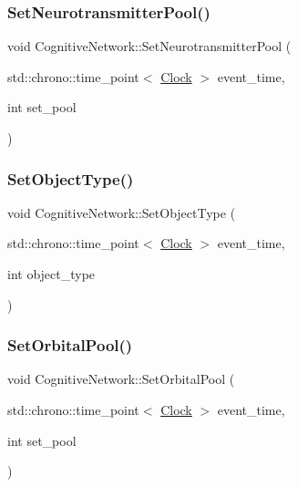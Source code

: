 \subsubsection{\texorpdfstring{Set\+Neurotransmitter\+Pool()}{SetNeurotransmitterPool()}}
{\footnotesize\ttfamily void Cognitive\+Network\+::\+Set\+Neurotransmitter\+Pool (\begin{DoxyParamCaption}\item[{std\+::chrono\+::time\+\_\+point$<$ \mbox{\hyperlink{universe_8h_a0ef8d951d1ca5ab3cfaf7ab4c7a6fd80}{Clock}} $>$}]{event\+\_\+time,  }\item[{int}]{set\+\_\+pool }\end{DoxyParamCaption})\hspace{0.3cm}{\ttfamily [inline]}}

\mbox{\label{classCognitiveNetwork_ad95a0b25c7f61fc52322938eb13c9e3e}} 
\subsubsection{\texorpdfstring{Set\+Object\+Type()}{SetObjectType()}}
{\footnotesize\ttfamily void Cognitive\+Network\+::\+Set\+Object\+Type (\begin{DoxyParamCaption}\item[{std\+::chrono\+::time\+\_\+point$<$ \mbox{\hyperlink{universe_8h_a0ef8d951d1ca5ab3cfaf7ab4c7a6fd80}{Clock}} $>$}]{event\+\_\+time,  }\item[{int}]{object\+\_\+type }\end{DoxyParamCaption})}

\mbox{\label{classCognitiveNetwork_aeee6e2b2eb06b3c55a0f019b6c9cc250}} 
\subsubsection{\texorpdfstring{Set\+Orbital\+Pool()}{SetOrbitalPool()}}
{\footnotesize\ttfamily void Cognitive\+Network\+::\+Set\+Orbital\+Pool (\begin{DoxyParamCaption}\item[{std\+::chrono\+::time\+\_\+point$<$ \mbox{\hyperlink{universe_8h_a0ef8d951d1ca5ab3cfaf7ab4c7a6fd80}{Clock}} $>$}]{event\+\_\+time,  }\item[{int}]{set\+\_\+pool }\end{DoxyParamCaption})\hspace{0.3cm}{\ttfamily [inline]}}

